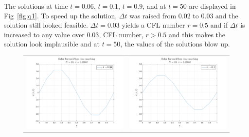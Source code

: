\documentclass[11pt]{article}
\begin{document}
\begin{enumerate}
The solutions at time $t = 0.06$, $t = 0.1$,  $t = 0.9$, and at $t = 50$ are displayed in Fig~\ref{fig:q1}. To speed up the solution, $\Delta t$ was raised from $0.02$ to $0.03$ and the solution still looked feasible. $\Delta t=0.03$ yields a CFL number $r = 0.5$ and if $\Delta t$ is increased to any value over $0.03$, CFL number, $r > 0.5$ and this makes the solution look implausible and at $t=50$, the values of the solutions blow up.
\begin{figure}[t]
\begin{tabular}{cc}
\includegraphics[width=3.65in]{q1_t1} & \includegraphics[width=3.65in]{q1_t2} \\

\end{tabular}
\end{figure}
\end{enumerate}
\end{document}

